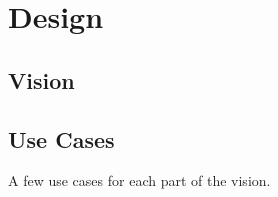 \chapter{Design}


\section{Vision}
\label{sec:vision}


\section{Use Cases}
A few use cases for each part of the vision.
